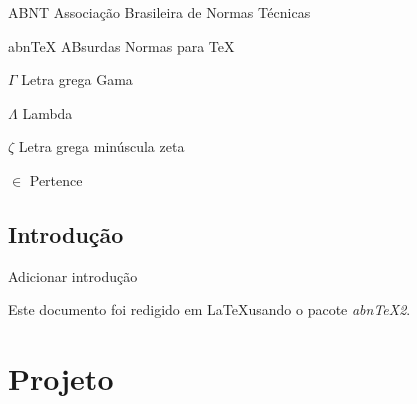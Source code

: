 \documentclass[
	12pt,				%
	openany,			%
	twoside,			%
	a4paper,			%
	english,			%
	french,				%
	spanish,			%
	brazil,				%
	]{abntex2}
\begin{document}
\listoffigures*
\cleardoublepage

\listoftables*
\cleardoublepage

\begin{siglas}
  \item[ABNT] Associação Brasileira de Normas Técnicas
  \item[abnTeX] ABsurdas Normas para TeX
\end{siglas}

\begin{simbolos}
  \item[$ \Gamma $] Letra grega Gama
  \item[$ \Lambda $] Lambda
  \item[$ \zeta $] Letra grega minúscula zeta
  \item[$ \in $] Pertence
\end{simbolos}

\tableofcontents*
\cleardoublepage


\textual

\chapter*[Introdução]{Introdução}
Adicionar introdução

Este documento foi redigido em \LaTeX usando o pacote \textit{abnTeX2}.
\part{Projeto}

\end{document}
